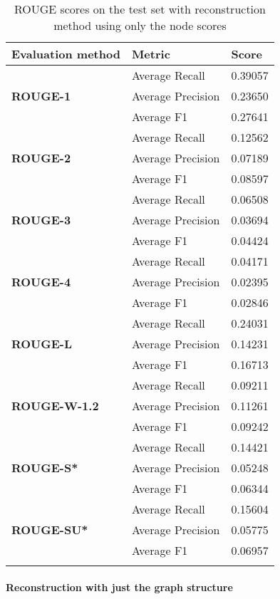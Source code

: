\begin{longtable}{| l | l | l |}
	\hline
	\textbf{Evaluation method}&\textbf{Metric}&\textbf{Score}\\ \hline \hline		
	\multirow{3}{*}{\textbf{ROUGE-1}}
		&Average Recall&0.39057 \\
		&Average Precision&0.23650 \\ 
		&Average F1&0.27641 \\ \hline \hline
	\multirow{3}{*}{\textbf{ROUGE-2}}
		&Average Recall&0.12562 \\
		&Average Precision&0.07189 \\
		&Average F1&0.08597 \\ \hline \hline
	\multirow{3}{*}{\textbf{ROUGE-3}}
		&Average Recall&0.06508 \\
		&Average Precision&0.03694 \\
		&Average F1&0.04424 \\ \hline \hline
	\multirow{3}{*}{\textbf{ROUGE-4}}
		&Average Recall&0.04171 \\
		&Average Precision&0.02395 \\
		&Average F1&0.02846 \\ \hline \hline
	\multirow{3}{*}{\textbf{ROUGE-L}}
		&Average Recall&0.24031 \\
		&Average Precision&0.14231 \\
		&Average F1&0.16713 \\ \hline \hline
	\multirow{3}{*}{\textbf{ROUGE-W-1.2}}
		&Average Recall&0.09211 \\
		&Average Precision&0.11261 \\
		&Average F1&0.09242 \\ \hline \hline
	\multirow{3}{*}{\textbf{ROUGE-S*}}
		&Average Recall&0.14421 \\
		&Average Precision&0.05248 \\
		&Average F1&0.06344 \\ \hline \hline
	\multirow{3}{*}{\textbf{ROUGE-SU*}}
		&Average Recall&0.15604 \\
		&Average Precision&0.05775 \\
		&Average F1&0.06957 \\ \hline
	\caption{ROUGE scores on the test set with reconstruction method using only the node scores}
\end{longtable}

\paragraph{Reconstruction with just the graph structure}

